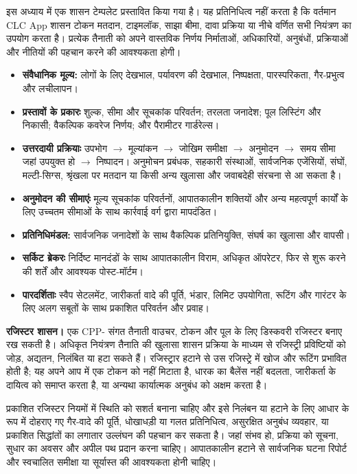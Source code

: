 \documentclass[11pt]{article}
\begin{document}
इस अध्याय में एक शासन टेम्पलेट प्रस्तावित किया गया है। यह प्रतिनिधित्व नहीं करता है कि वर्तमान CLC App शासन टोकन मतदान, टाइमलॉक, साझा बीमा, दावा प्रक्रिया या नीचे वर्णित सभी नियंत्रण का उपयोग करता है। प्रत्येक तैनाती को अपने वास्तविक निर्णय निर्माताओं, अधिकारियों, अनुबंधों, प्रक्रियाओं और नीतियों की पहचान करने की आवश्यकता होगी।

\begin{itemize}[leftmargin=*]
\item \textbf{संवैधानिक मूल्य:} लोगों के लिए देखभाल, पर्यावरण की देखभाल, निष्पक्षता, पारस्परिकता, गैर-प्रभुत्व और लचीलापन।
\item \textbf{प्रस्तावों के प्रकारः} शुल्क, सीमा और सूचकांक परिवर्तन; तरलता जनादेश; पूल लिस्टिंग और निकासी; वैकल्पिक कवरेज निर्णय; और पैरामीटर गार्डरेल्स।
\item \textbf{उत्तरदायी प्रक्रियाः} उपभोग $\to$ मूल्यांकन $\to$ जोखिम समीक्षा $\to$ अनुमोदन $\to$ समय सीमा जहां उपयुक्त हो $\to$ निष्पादन। अनुमोचन प्रबंधक, सहकारी संस्थाओं, सार्वजनिक एजेंसियों, संघों, मल्टी-सिग्स, श्रृंखला पर मतदान या किसी अन्य खुलासा और जवाबदेही संरचना से आ सकता है।
\item \textbf{अनुमोदन की सीमाएंः} मूल्य सूचकांक परिवर्तनों, आपातकालीन शक्तियों और अन्य महत्वपूर्ण कार्यों के लिए उच्चतम सीमाओं के साथ कार्रवाई वर्ग द्वारा मापदंडित।
\item \textbf{प्रतिनिधिमंडल:} सार्वजनिक जनादेशों के साथ वैकल्पिक प्रतिनियुक्ति, संघर्ष का खुलासा और वापसी।
\item \textbf{सर्किट ब्रेकरः} निर्दिष्ट मानदंडों के साथ आपातकालीन विराम, अधिकृत ऑपरेटर, फिर से शुरू करने की शर्तें और आवश्यक पोस्ट-मॉर्टम।
\item \textbf{पारदर्शिताः} स्वैप सेटलमेंट, जारीकर्ता वादे की पूर्ति, भंडार, लिमिट उपयोगिता, रूटिंग और गारंटर के लिए अलग सबूतों के साथ प्रकाशित परिवर्तन और प्रवाह।
\end{itemize}
\textbf{रजिस्टर शासन।} एक CPP- संगत तैनाती वाउचर, टोकन और पूल के लिए डिस्कवरी रजिस्टर बनाए रख सकती है। अधिकृत नियंत्रण तैनाति की खुलासा शासन प्रक्रिया के माध्यम से रजिस्ट्री प्रविष्टियों को जोड़, अद्यतन, निलंबित या हटा सकते हैं। रजिस्ट्रार हटाने से उस रजिस्ट्रे में खोज और रूटिंग प्रभावित होती है; यह अपने आप में एक टोकन को नहीं मिटाता है, धारक का बैलेंस नहीं बदलता, जारीकर्ता के दायित्व को समाप्त करता है, या अन्यथा कार्यात्मक अनुबंध को अक्षम करता है।

प्रकाशित रजिस्टर नियमों में स्थिति को सशर्त बनाना चाहिए और इसे निलंबन या हटाने के लिए आधार के रूप में दोहराए गए गैर-वादे की पूर्ति, धोखाधड़ी या गलत प्रतिनिधित्व, असुरक्षित अनुबंध व्यवहार, या प्रकाशित सिद्धांतों का लगातार उल्लंघन की पहचान कर सकता है। जहां संभव हो, प्रक्रिया को सूचना, सुधार का अवसर और अपील पथ प्रदान करना चाहिए। आपातकालीन हटाने से सार्वजनिक घटना रिपोर्ट और स्वचालित समीक्षा या सूर्यास्त की आवश्यकता होनी चाहिए।
\end{document}
